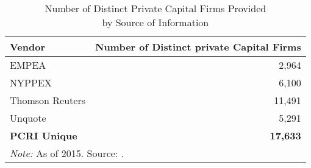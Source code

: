 
\begin{table}
    \centering

\caption{\label{tab:pcritable1}Number of Distinct Private Capital Firms Provided \\by Source of Information}
\begin{tabular}[t]{lr}
\toprule
Vendor & Number of Distinct private Capital Firms\\
\midrule
EMPEA & 2,964\\
NYPPEX & 6,100\\
Thomson Reuters & 11,491\\
Unquote & 5,291\\
\midrule
\textbf{PCRI Unique} & \textbf{17,633}\\
\bottomrule
\multicolumn{2}{l}{\textit{Note: } As of 2015. Source: \citet{jeng2015}.}\\
\end{tabular}
\end{table}

